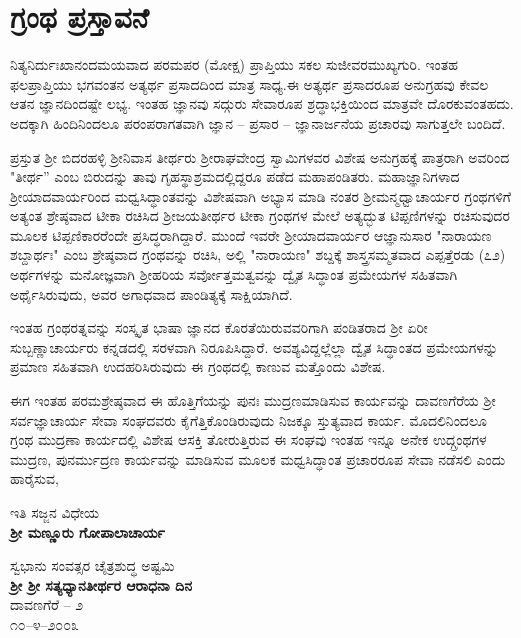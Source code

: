 

\begin{center}
\end{center}

\chapter*{ಗ್ರಂಥ ಪ್ರಸ್ತಾವನೆ}

\vskip -10pt

ನಿತ್ಯನಿರ್ದುಃಖಾನಂದಮಯವಾದ ಪರಮಪರ (ಮೋಕ್ಷ) ಪ್ರಾಪ್ತಿಯು ಸಕಲ ಸುಜೀವರ\break ಮುಖ್ಯಗುರಿ. ಇಂತಹ ಫಲಪ್ರಾಪ್ತಿಯು ಭಗವಂತನ ಅತ್ಯರ್ಥ ಪ್ರಸಾದದಿಂದ ಮಾತ್ರ ಸಾಧ್ಯ.\break ಈ ಅತ್ಯರ್ಥ ಪ್ರಸಾದರೂಪ ಅನುಗ್ರಹವು ಕೇವಲ ಆತನ ಜ್ಞಾನದಿಂದಷ್ಟೇ ಲಭ್ಯ. ಇಂತಹ ಜ್ಞಾನವು ಸದ್ಗುರು ಸೇವಾರೂಪ ಶ್ರದ್ಧಾಭಕ್ತಿಯಿಂದ ಮಾತ್ರವೇ ದೊರಕುವಂತಹದು. ಅದಕ್ಕಾಗಿ ಹಿಂದಿನಿಂದಲೂ ಪರಂಪರಾಗತವಾಗಿ ಜ್ಞಾನ – ಪ್ರಸಾರ – ಜ್ಞಾನಾರ್ಜನೆಯ ಪ್ರಚಾರವು ಸಾಗು\-ತ್ತಲೇ ಬಂದಿದೆ.

\vskip 4pt

ಪ್ರಸ್ತುತ ಶ‍್ರೀ ಬಿದರಹಳ್ಳಿ ಶ‍್ರೀನಿವಾಸ ತೀರ್ಥರು ಶ‍್ರೀರಾಘವೇಂದ್ರ ಸ್ವಾಮಿಗಳವರ ವಿಶೇಷ ಅನುಗ್ರಹಕ್ಕೆ ಪಾತ್ರರಾಗಿ ಅವರಿಂದ "ತೀರ್ಥ'' ಎಂಬ ಬಿರುದನ್ನು ತಾವು ಗೃಹಸ್ಥಾ\-ಶ್ರಮದಲ್ಲಿದ್ದರೂ ಪಡೆದ ಮಹಾಪಂಡಿತರು. ಮಹಾಜ್ಞಾನಿಗಳಾದ ಶ‍್ರೀಯಾದವಾರ್ಯರಿಂದ ಮಧ್ವಸಿದ್ಧಾಂತವನ್ನು ವಿಶೇಷವಾಗಿ ಅಭ್ಯಾಸ ಮಾಡಿ ನಂತರ ಶ‍್ರೀಮನ್ಮಧ್ವಾಚಾರ್ಯರ ಗ್ರಂಥಗಳಿಗೆ ಅತ್ಯಂತ ಶ್ರೇಷ್ಠವಾದ ಟೀಕಾ ರಚಿಸಿದ ಶ‍್ರೀಜಯತೀರ್ಥರ ಟೀಕಾ ಗ್ರಂಥಗಳ ಮೇಲೆ ಅತ್ಯದ್ಭುತ ಟಿಪ್ಪಣಿಗಳನ್ನು ರಚಿಸುವುದರ ಮೂಲಕ ಟಿಪ್ಪಣಿಕಾರರೆಂದೇ ಪ್ರಸಿದ್ಧರಾಗಿದ್ದಾರೆ. ಮುಂದೆ ಇವರೇ ಶ‍್ರೀಯಾದವಾರ್ಯರ ಆಜ್ಞಾನುಸಾರ "ನಾರಾಯಣ ಶಬ್ದಾರ್ಥಃ" ಎಂಬ ಶ್ರೇಷ್ಠವಾದ ಗ್ರಂಥವನ್ನು ರಚಿಸಿ, ಅಲ್ಲಿ "ನಾರಾಯಣ" ಶಬ್ದಕ್ಕೆ ಶಾಸ್ತ್ರಸಮ್ಮತವಾದ ಎಪ್ಪತ್ತೆರಡು (೭೨) ಅರ್ಥಗಳನ್ನು ಮನೋಜ್ಞವಾಗಿ ಶ‍್ರೀಹರಿಯ ಸರ್ವೋತ್ತಮತ್ವವನ್ನು ದ್ವೈತ ಸಿದ್ಧಾಂತ ಪ್ರಮೇಯಗಳ ಸಹಿತವಾಗಿ ಅರ್ಥೈಸಿರುವುದು, ಅವರ ಅಗಾಧವಾದ ಪಾಂಡಿತ್ಯಕ್ಕೆ ಸಾಕ್ಷಿಯಾಗಿದೆ.

\vskip 4pt

ಇಂತಹ ಗ್ರಂಥರತ್ನವನ್ನು ಸಂಸ್ಕೃತ ಭಾಷಾ ಜ್ಞಾನದ ಕೊರತೆಯಿರುವವರಿಗಾಗಿ ಪಂಡಿತರಾದ ಶ‍್ರೀ ಏರೀ ಸುಬ್ಬಣ್ಣಾಚಾರ್ಯರು ಕನ್ನಡದಲ್ಲಿ ಸರಳವಾಗಿ ನಿರೂಪಿಸಿದ್ದಾರೆ. ಅವಶ್ಯವಿದ್ದಲ್ಲೆಲ್ಲಾ ದ್ವೈತ ಸಿದ್ಧಾಂತದ ಪ್ರಮೇಯಗಳನ್ನು ಪ್ರಮಾಣ ಸಹಿತವಾಗಿ ಉದಹರಿಸಿರುವುದು ಈ ಗ್ರಂಥದಲ್ಲಿ ಕಾಣುವ ಮತ್ತೊಂದು ವಿಶೇಷ.

ಈಗ ಇಂತಹ ಪರಮಶ್ರೇಷ್ಠವಾದ ಈ ಹೊತ್ತಿಗೆಯನ್ನು ಪುನಃ ಮುದ್ರಣಮಾಡಿಸುವ ಕಾರ್ಯವನ್ನು ದಾವಣಗೆರೆಯ ಶ‍್ರೀ ಸರ್ವಜ್ಞಾಚಾರ್ಯ ಸೇವಾ ಸಂಘದವರು ಕೈಗೆತ್ತಿಕೊಂಡಿರುವುದು ನಿಜಕ್ಕೂ ಸ್ತುತ್ಯವಾದ ಕಾರ್ಯ. ಮೊದಲಿನಿಂದಲೂ ಗ್ರಂಥ ಮುದ್ರಣಾ ಕಾರ್ಯದಲ್ಲಿ ವಿಶೇಷ ಆಸಕ್ತಿ ತೋರುತ್ತಿರುವ ಈ ಸಂಘವು ಇಂತಹ ಇನ್ನೂ ಅನೇಕ ಉದ್ಗ್ರಂಥಗಳ ಮುದ್ರಣ, ಪುನರ್ಮುದ್ರಣ ಕಾರ್ಯವನ್ನು ಮಾಡಿಸುವ ಮೂಲಕ ಮಧ್ವಸಿದ್ಧಾಂತ ಪ್ರಚಾರರೂಪ ಸೇವಾ ನಡೆಸಲಿ ಎಂದು ಹಾರೈಸುವ,

\begin{flushright}
ಇತಿ ಸಜ್ಜನ ವಿಧೇಯ\\\textbf{ಶ‍್ರೀ ಮಣ್ಣೂರು ಗೋಪಾಲಾಚಾರ್ಯ}
\end{flushright}

\noindent
ಸ್ವಭಾನು ಸಂವತ್ಸರ ಚೈತ್ರಶುದ್ಧ ಅಷ್ಟಮಿ\\\textbf{ಶ‍್ರೀ ಶ‍್ರೀ ಸತ್ಯಧ್ಯಾನತೀರ್ಥರ ಆರಾಧನಾ ದಿನ}\\ ದಾವಣಗೆರೆ – ೨\\ ೧೦–೪–೨೦೦೩


